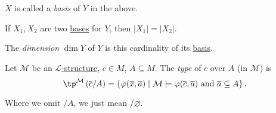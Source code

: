 \begin{notation}[Basis]\label{not:basis}
	\(X\) is called a \emph{basis} of \(Y\) in the above.
\end{notation}

\begin{remark}
	If \(X_1, X_2\) are two \hyperref[not:basis]{bases} for \(Y\), then \(\vert X_1 \vert = \vert X_2 \vert \).
\end{remark}

\begin{notation}[Dimension]\label{def:dimension}
	The \emph{dimension} \(\dim Y\) of \(Y\) is this cardinality of its \hyperref[not:basis]{basis}.
\end{notation}

\begin{definition}[Type]\label{def:type}
	Let \(\mathcal{M} \) be an \hyperref[def:structure]{\(\mathcal{L} \)-structure}, \(\overline{c} \in M\), \(A \subseteq M\). The \emph{type} of \(\overline{c} \) over \(A\) (in \(\mathcal{M} \)) is
	\[
		\tp^{\mathcal{M} }\left( \overline{c} / A \right) = \left\{ \varphi (\overline{x} , \overline{a} ) \mid \mathcal{M} \models \varphi (\overline{c} , \overline{a} ) \text{ and } \overline{a} \subseteq A \right\}.
	\]
\end{definition}

\begin{notation}
	Where we omit \(/ A\), we just mean \(/ \varnothing\).
\end{notation}

